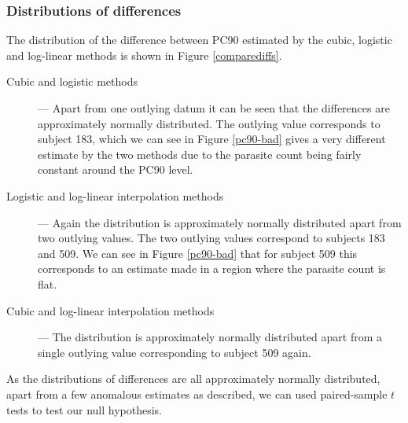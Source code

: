 \subsubsection*{Distributions of differences}
The distribution of the difference between PC90 estimated by the cubic, logistic and log-linear methods is shown in Figure \ref{comparediffs}.
\begin{description}
\item[Cubic and logistic methods] --- Apart from one outlying datum it can be seen that the differences are approximately normally distributed. The outlying value corresponds to subject 183, which we can see in Figure \ref{pc90-bad} gives a very different estimate by the two methods due to the parasite count being fairly constant around the PC90 level.
\item[Logistic and log-linear interpolation methods] --- Again the distribution is approximately normally distributed apart from two outlying values. The two outlying values correspond to subjects 183 and 509. We can see in Figure \ref{pc90-bad} that for subject 509 this corresponds to an estimate made in a region where the parasite count is flat.
\item[Cubic and log-linear interpolation methods] --- The distribution is approximately normally distributed apart from a single outlying value corresponding to subject 509 again. 
\end{description}
As the distributions of differences are all approximately normally distributed, apart from a few anomalous estimates as described, we can used paired-sample $t$ tests to test our null hypothesis.
